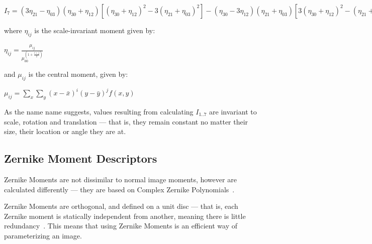 $I_7 = (3 \eta_{21} - \eta_{03})(\eta_{30} + \eta_{12})[(\eta_{30} + \eta_{12})^2 - 3(\eta_{21} + \eta_{03})^2] - (\eta_{30} - 3\eta_{12})(\eta_{21} + \eta_{03})[3(\eta_{30} + \eta_{12})^2 - (\eta_{21} + \eta_{03})^2]$

where $\eta_{ij}$ is the scale-invariant moment given by:

$\eta_{ij} = \frac{\mu_{ij}} {\mu_{00}^{\left(1 + \frac{i+j}{2}\right)}}\,\!$

and $\mu_{ij}$ is the central moment, given by:

$\mu_{ij} = \sum_{x} \sum_{y} (x - \bar{x})^i(y - \bar{y})^j f(x,y)$

As the name name suggests, values resulting from calculating $I_{1..7}$ are invariant to scale, rotation and translation --- that is, they remain constant no matter their size, their location or angle they are at. 

\subsection{Zernike Moment Descriptors}
\label{sec:zernike}
Zernike Moments are not dissimilar to normal image moments, however are calculated differently --- they are based on Complex Zernike Polynomials~\cite{liao1997image}.

Zernike Moments are orthogonal, and defined on a unit disc --- that is, each Zernike moment is statically independent from another, meaning there is little redundancy~\cite{amayeh2005accurate}. This means that using Zernike Moments is an efficient way of parameterizing an image.
